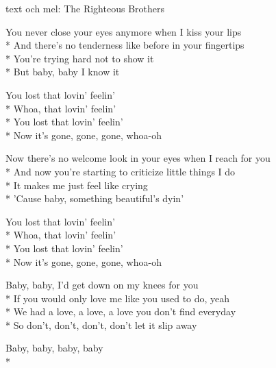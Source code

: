 \begin{SongText}
    \begin{SongInfo}
        text och mel: The Righteous Brothers
    \end{SongInfo}
    \begin{SongVerse}
        You never close your eyes anymore when I kiss your lips\\*%
        And there's no tenderness like before in your fingertips\\*%
        You're trying hard not to show it\\*%
        But baby, baby I know it
    \end{SongVerse}
    \begin{SongVerse}
        You lost that lovin' feelin'\\*%
        Whoa, that lovin' feelin'\\*%
        You lost that lovin' feelin'\\*%
        Now it's gone, gone, gone, whoa-oh
    \end{SongVerse}
    \begin{SongVerse}
        Now there's no welcome look in your eyes when I reach for you\\*%
        And now you're starting to criticize little things I do\\*%
        It makes me just feel like crying\\*%
        'Cause baby, something beautiful's dyin'
    \end{SongVerse}
    \begin{SongVerse}
        You lost that lovin' feelin'\\*%
        Whoa, that lovin' feelin'\\*%
        You lost that lovin' feelin'\\*%
        Now it's gone, gone, gone, whoa-oh
    \end{SongVerse}
    \begin{SongVerse}
        Baby, baby, I'd get down on my knees for you\\*%
        If you would only love me like you used to do, yeah\\*%
        We had a love, a love, a love you don't find everyday\\*%
        So don't, don't, don't, don't let it slip away
    \end{SongVerse}
    \begin{SongVerse}
        Baby, baby, baby, baby\\*%

\end{SongVerse}
\end{SongText}
